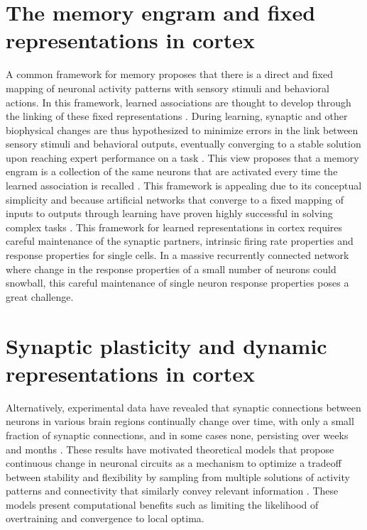 \section{The memory engram and fixed representations in cortex} 
A common framework for memory proposes that there is a direct and fixed mapping of neuronal activity patterns with sensory stimuli and behavioral actions. In this framework, learned associations are thought to develop through the linking of these fixed representations \citep{Messinger2001, Sakai1991, Veit2015}. During learning, synaptic and other biophysical changes are thus hypothesized to minimize errors in the link between sensory stimuli and behavioral outputs, eventually converging to a stable solution upon reaching expert performance on a task \citep{Ganguly2009, Peters2014, Chestek2007}. This view proposes that a memory engram is a collection of the same neurons that are activated every time the learned association is recalled \citep{Tonegawa2015}. This framework is appealing due to its conceptual simplicity and because artificial networks that converge to a fixed mapping of inputs to outputs through learning have proven highly successful in solving complex tasks \citep{Abbott2009, Buonomano2005, LeCun2015}. This framework for learned representations in cortex requires careful maintenance of the synaptic partners, intrinsic firing rate properties and response properties for single cells. In a massive recurrently connected network where change in the response properties of a small number of neurons could snowball, this careful maintenance of single neuron response properties poses a great challenge.

\section{Synaptic plasticity and dynamic representations in cortex} 
Alternatively, experimental data have revealed that synaptic connections between neurons in various brain regions continually change over time, with only a small fraction of synaptic connections, and in some cases none, persisting over weeks and months \citep{Attardo2015, Stettler2006, Trachtenberg2002}. These results have motivated theoretical models that propose continuous change in neuronal circuits as a mechanism to optimize a tradeoff between stability and flexibility by sampling from multiple solutions of activity patterns and connectivity that similarly convey relevant information \citep{Ajemian2013, Kappel2015, Rokni2007a}. These models present computational benefits such as limiting the likelihood of overtraining and convergence to local optima.


